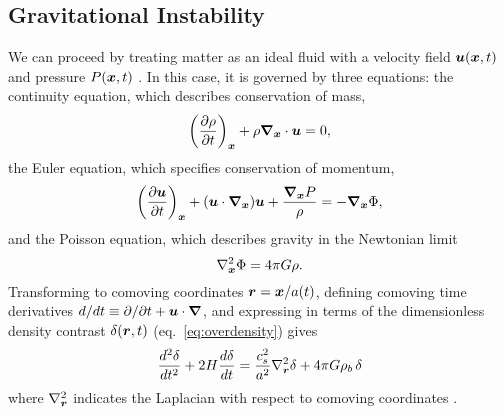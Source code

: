 \subsection{Gravitational Instability}
We can proceed by treating matter as an ideal fluid with a
velocity field $\boldsymbol{u}(\boldsymbol{x}, t)$ and pressure $P(\boldsymbol{x}, t)$
\citep{longair2008galaxy}.
In this case, it is governed by three equations: the
continuity equation, which describes conservation of mass,
\begin{equation}
  \label{eq:continuity}
  \left(\frac{\partial\rho}{\partial t}\right)_{\boldsymbol{x}}
  + \rho\boldsymbol{\nabla}_{\boldsymbol{x}}\cdot\boldsymbol{u} = 0,
\end{equation}
the Euler equation, which specifies conservation of momentum,
\begin{equation}
  \label{eq:euler}
  \left(\frac{\partial\boldsymbol{u}}{\partial t}\right)_{\boldsymbol{x}}
  + (\boldsymbol{u}\cdot\boldsymbol{\nabla}_{\boldsymbol{x}})\boldsymbol{u}
  + \frac{\boldsymbol{\nabla}_{\boldsymbol{x}}P}{\rho}
  = -\boldsymbol{\nabla}_{\boldsymbol{x}}\Phi,
\end{equation}
and the Poisson equation, which describes gravity in the Newtonian limit
\begin{equation}
  \label{eq:poisson}
  \nabla_{\boldsymbol{x}}^2\Phi = 4\pi G\rho.
\end{equation}
Transforming to comoving coordinates $\boldsymbol{r} = \boldsymbol{x}/a(t)$,
defining comoving time derivatives
$d/dt \equiv \partial/\partial t + \boldsymbol{u}\cdot\boldsymbol{\nabla}$,
and expressing in terms of the dimensionless density contrast
$\delta(\boldsymbol{r}, t)$ (eq.~\ref{eq:overdensity}) gives
\begin{equation}
  \label{eq:delta_evolution}
  \frac{d^2\delta}{d t^2} + 2 H \frac{d\delta}{d t}
  = \frac{c_s^2}{a^2}\nabla_{\boldsymbol{r}}^2\delta + 4\pi G \rho_b\,\delta
\end{equation}
where $\nabla^2_{\boldsymbol{r}}$ indicates the Laplacian with respect to comoving
coordinates \citep[for derivation see section 11.2 of][]{longair2008galaxy}.

